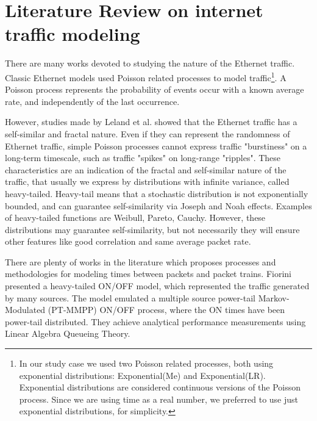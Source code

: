 \section{Literature Review on internet traffic modeling}


There are many works devoted to studying the nature of the Ethernet traffic\cite{selfsimilar-ethernet}. Classic Ethernet models used Poisson related processes to model traffic\footnote{In our study case we used two Poisson related processes, both using exponential distributions: Exponential(Me) and Exponential(LR). Exponential distributions are considered continuous versions of the Poisson process.  Since we are using time as a real number, we preferred to use just exponential distributions, for simplicity.}. A Poisson process represents the probability of events occur with a known average rate, and independently of the last occurrence\cite{book-poisson}. 

However, studies made by Leland et al.  showed that the Ethernet traffic has a self-similar and fractal nature. Even if they can represent the randomness of   Ethernet traffic, simple Poisson processes cannot express traffic "burstiness" on a long-term timescale, such as traffic "spikes" on long-range "ripples". These characteristics are an indication of the fractal and self-similar nature of the traffic, that usually we express by distributions with infinite variance, called heavy-tailed. Heavy-tail means that a stochastic distribution is not exponentially bounded\cite{sourcesonoff-paper}, and can guarantee self-similarity via Joseph and Noah effects\cite{selfsimilar-highvariability}. Examples of heavy-tailed functions are Weibull, Pareto, Cauchy. However, these distributions may guarantee self-similarity, but not necessarily they will ensure other features like good correlation and same average packet rate\cite{validate-trafficgen}. 

There are plenty of works in the literature which proposes processes and methodologies for modeling times between packets and packet trains\cite{selfsimilar-ethernet}\cite{analysis-self-similar}\cite{stochastic-selfsimilar}\cite{selfsimilar-highvariability}\cite{multi-player-online-game-self-similarity}\cite{estimation-renewal-function-ethernet-traffic}\cite{modelling-of-self-similar}\cite{empirical-interarrival-study}\cite{modeling-concurrent-heavy-tailed}\cite{optimal-scheduling-of-heavy-tailed-traffic}\cite{modelling-of-self-similar}. Fiorini\cite{modeling-concurrent-heavy-tailed}  presented a heavy-tailed ON/OFF model, which represented the traffic generated by many sources. The model emulated a multiple source power-tail Markov-Modulated (\acrshort{PT-MMPP}) ON/OFF process, where the ON times have been power-tail distributed. They achieve analytical performance measurements using Linear Algebra Queueing Theory. 

